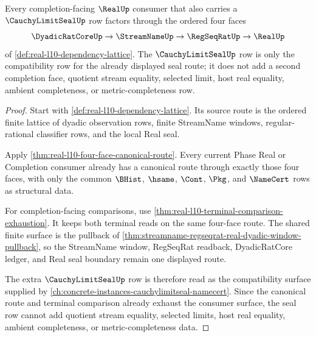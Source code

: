 \begin{theorem}
\label{thm:real-streamname-regseqrat-seal-lattice}
Every completion-facing $\RealUp$ consumer that also carries a $\CauchyLimitSealUp$ row factors through the ordered four faces
$$
\DyadicRatCoreUp \to \StreamNameUp \to \RegSeqRatUp \to \RealUp
$$
of \autoref{def:real-l10-dependency-lattice}. The $\CauchyLimitSealUp$ row is only the compatibility row for the already displayed seal route; it does not add a second completion face, quotient stream equality, selected limit, host real equality, ambient completeness, or metric-completeness row.
\end{theorem}
\begin{proof}
Start with \autoref{def:real-l10-dependency-lattice}. Its source route is the ordered finite lattice of dyadic observation rows, finite StreamName windows, regular-rational classifier rows, and the local Real seal.

Apply \autoref{thm:real-l10-four-face-canonical-route}. Every current Phase Real or Completion consumer already has a canonical route through exactly those four faces, with only the common $\BHist$, $\hsame$, $\Cont$, $\Pkg$, and $\NameCert$ rows as structural data.

For completion-facing comparisons, use \autoref{thm:real-l10-terminal-comparison-exhaustion}. It keeps both terminal reads on the same four-face route. The shared finite surface is the pullback of \autoref{thm:streamname-regseqrat-real-dyadic-window-pullback}, so the StreamName window, RegSeqRat readback, DyadicRatCore ledger, and Real seal boundary remain one displayed route.

The extra $\CauchyLimitSealUp$ row is therefore read as the compatibility surface supplied by \autoref{ch:concrete-instances-cauchylimitseal-namecert}. Since the canonical route and terminal comparison already exhaust the consumer surface, the seal row cannot add quotient stream equality, selected limits, host real equality, ambient completeness, or metric-completeness data.
\end{proof}

